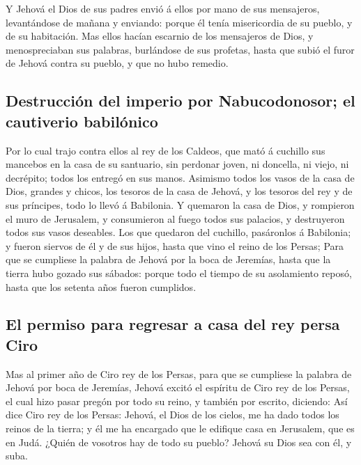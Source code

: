  Y Jehová el Dios de sus padres envió á ellos por mano de
sus mensajeros, levantándose de mañana y enviando: porque él tenía
misericordia de su pueblo, y de su habitación.  Mas ellos
hacían escarnio de los mensajeros de Dios, y menospreciaban sus
palabras, burlándose de sus profetas, hasta que subió el furor de Jehová
contra su pueblo, y que no hubo remedio.

\hypertarget{destrucciuxf3n-del-imperio-por-nabucodonosor-el-cautiverio-babiluxf3nico}{%
\subsection{Destrucción del imperio por Nabucodonosor; el cautiverio
babilónico}\label{destrucciuxf3n-del-imperio-por-nabucodonosor-el-cautiverio-babiluxf3nico}}

 Por lo cual trajo contra ellos al rey de los Caldeos, que
mató á cuchillo sus mancebos en la casa de su santuario, sin perdonar
joven, ni doncella, ni viejo, ni decrépito; todos los entregó en sus
manos.  Asimismo todos los vasos de la casa de Dios,
grandes y chicos, los tesoros de la casa de Jehová, y los tesoros del
rey y de sus príncipes, todo lo llevó á Babilonia.  Y
quemaron la casa de Dios, y rompieron el muro de Jerusalem, y
consumieron al fuego todos sus palacios, y destruyeron todos sus vasos
deseables.  Los que quedaron del cuchillo, pasáronlos á
Babilonia; y fueron siervos de él y de sus hijos, hasta que vino el
reino de los Persas;  Para que se cumpliese la palabra de
Jehová por la boca de Jeremías, hasta que la tierra hubo gozado sus
sábados: porque todo el tiempo de su asolamiento reposó, hasta que los
setenta años fueron cumplidos.

\hypertarget{el-permiso-para-regresar-a-casa-del-rey-persa-ciro}{%
\subsection{El permiso para regresar a casa del rey persa
Ciro}\label{el-permiso-para-regresar-a-casa-del-rey-persa-ciro}}

 Mas al primer año de Ciro rey de los Persas, para que se
cumpliese la palabra de Jehová por boca de Jeremías, Jehová excitó el
espíritu de Ciro rey de los Persas, el cual hizo pasar pregón por todo
su reino, y también por escrito, diciendo:  Así dice Ciro
rey de los Persas: Jehová, el Dios de los cielos, me ha dado todos los
reinos de la tierra; y él me ha encargado que le edifique casa en
Jerusalem, que es en Judá. ¿Quién de vosotros hay de todo su pueblo?
Jehová su Dios sea con él, y suba.
